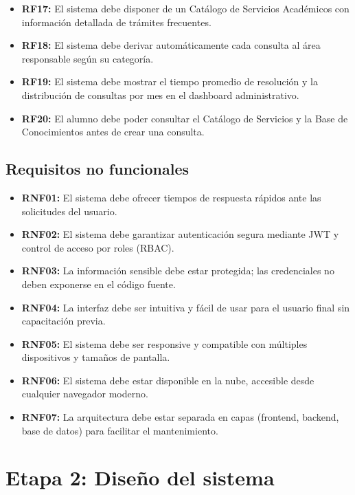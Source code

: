 \documentclass[12pt,a4paper]{article}
\begin{document}
\begin{itemize}
	\item \textbf{RF17:} El sistema debe disponer de un Catálogo de Servicios Académicos con información detallada de trámites frecuentes.
	\item \textbf{RF18:} El sistema debe derivar automáticamente cada consulta al área responsable según su categoría.
	\item \textbf{RF19:} El sistema debe mostrar el tiempo promedio de resolución y la distribución de consultas por mes en el dashboard administrativo.
	\item \textbf{RF20:} El alumno debe poder consultar el Catálogo de Servicios y la Base de Conocimientos antes de crear una consulta.
	\end{itemize}

	\subsection{Requisitos no funcionales}
	\begin{itemize}
	\setlength{\itemindent}{1cm}
	\item \textbf{RNF01:} El sistema debe ofrecer tiempos de respuesta rápidos ante las solicitudes del usuario.
	\item \textbf{RNF02:} El sistema debe garantizar autenticación segura mediante JWT y control de acceso por roles (RBAC).
	\item \textbf{RNF03:} La información sensible debe estar protegida; las credenciales no deben exponerse en el código fuente.
	\item \textbf{RNF04:} La interfaz debe ser intuitiva y fácil de usar para el usuario final sin capacitación previa.
	\item \textbf{RNF05:} El sistema debe ser responsive y compatible con múltiples dispositivos y tamaños de pantalla.
	\item \textbf{RNF06:} El sistema debe estar disponible en la nube, accesible desde cualquier navegador moderno.
	\item \textbf{RNF07:} La arquitectura debe estar separada en capas (frontend, backend, base de datos) para facilitar el mantenimiento.
	\end{itemize}

	\newpage

	\section{Etapa 2: Diseño del sistema}
\end{document}
